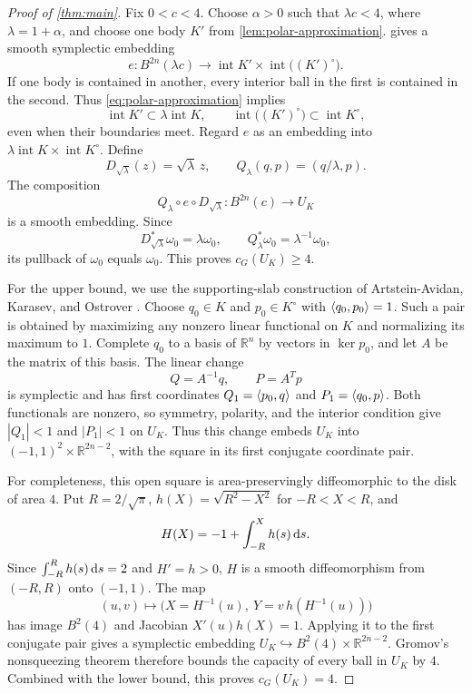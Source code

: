 \begin{proof}[Proof of \cref{thm:main}]
Fix $0<c<4$. Choose $\alpha>0$ such that $\lambda c<4$, where $\lambda=1+\alpha$, and choose one body $K'$ from \cref{lem:polar-approximation}.  gives a smooth symplectic embedding
\[
 e:B^{2n}(\lambda c)\longrightarrow
 \operatorname{int} K'\times\operatorname{int}\bigl((K')^\circ\bigr).
\]
If one body is contained in another, every interior ball in the first is contained in the second. Thus \eqref{eq:polar-approximation} implies
\[
 \operatorname{int} K'\subset\lambda\operatorname{int} K,
 \qquad \operatorname{int}\bigl((K')^\circ\bigr)\subset\operatorname{int} K^\circ,
\]
even when their boundaries meet. Regard $e$ as an embedding into $\lambda\operatorname{int} K\times\operatorname{int} K^\circ$. Define
\[
 D_{\sqrt\lambda}(z)=\sqrt\lambda\,z,
 \qquad Q_\lambda(q,p)=(q/\lambda,p).
\]
The composition
\begin{equation}\label{eq:general-rescaling}
 Q_\lambda\circ e\circ D_{\sqrt\lambda}:
 B^{2n}(c)\longrightarrow U_K
\end{equation}
is a smooth embedding. Since
\[
 D_{\sqrt\lambda}^*\omega_0=\lambda\omega_0,
 \qquad Q_\lambda^*\omega_0=\lambda^{-1}\omega_0,
\]
its pullback of $\omega_0$ equals $\omega_0$. This proves $c_G(U_K)\ge4$.

For the upper bound, we use the supporting-slab construction of Artstein-Avidan, Karasev, and Ostrover \cite[Remark~4.2]{AAKO2014}. Choose $q_0\in K$ and $p_0\in K^\circ$ with $\langle q_0,p_0\rangle=1$. Such a pair is obtained by maximizing any nonzero linear functional on $K$ and normalizing its maximum to $1$. Complete $q_0$ to a basis of $\mathbb{R}^n$ by vectors in $\ker p_0$, and let $A$ be the matrix of this basis. The linear change
\[
 Q=A^{-1}q,\qquad P=A^Tp
\]
is symplectic and has first coordinates $Q_1=\langle p_0,q\rangle$ and $P_1=\langle q_0,p\rangle$. Both functionals are nonzero, so symmetry, polarity, and the interior condition give $|Q_1|<1$ and $|P_1|<1$ on $U_K$. Thus this change embeds $U_K$ into $(-1,1)^2\times\mathbb{R}^{2n-2}$, with the square in its first conjugate coordinate pair.

For completeness, this open square is area-preservingly diffeomorphic to the disk of area $4$. Put $R=2/\sqrt\pi$, $h(X)=\sqrt{R^2-X^2}$ for $-R<X<R$, and
\[
 H(X)=-1+\int_{-R}^{X}h(s)\,\mathrm{d} s.
\]
Since $\int_{-R}^{R}h(s)\,\mathrm{d} s=2$ and $H'=h>0$, $H$ is a smooth diffeomorphism from $(-R,R)$ onto $(-1,1)$. The map
\[
 (u,v)\longmapsto
 \bigl(X=H^{-1}(u),\ Y=v\,h(H^{-1}(u))\bigr)
\]
has image $B^2(4)$ and Jacobian $X'(u)h(X)=1$. Applying it to the first conjugate pair gives a symplectic embedding $U_K\hookrightarrow B^2(4)\times\mathbb{R}^{2n-2}$. Gromov's nonsqueezing theorem \cite{Gromov1985} therefore bounds the capacity of every ball in $U_K$ by $4$. Combined with the lower bound, this proves $c_G(U_K)=4$.
\end{proof}

